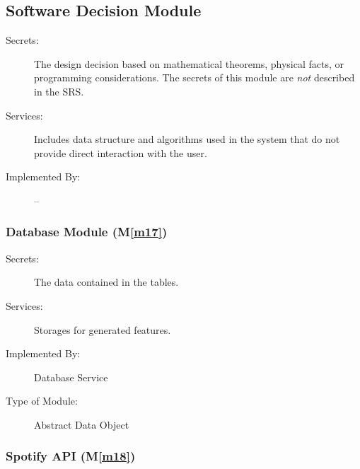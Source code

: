 \documentclass[12pt, titlepage]{article}
\newcommand{\mref}[1]{M\ref{#1}}
\begin{document}
\subsection{Software Decision Module}

\begin{description}
\item[Secrets:] The design decision based on mathematical theorems, physical
  facts, or programming considerations. The secrets of this module are
  \emph{not} described in the SRS.
\item[Services:] Includes data structure and algorithms used in the system that
  do not provide direct interaction with the user. 
\item[Implemented By:] --
\end{description}

\subsubsection{Database Module (\mref{m17})}

\begin{description}
\item[Secrets:] The data contained in the tables. 
\item[Services:] Storages for generated features. 
\item[Implemented By:] Database Service
\item[Type of Module:] Abstract Data Object
\end{description}



\subsubsection{Spotify API (\mref{m18})}
\end{document}
